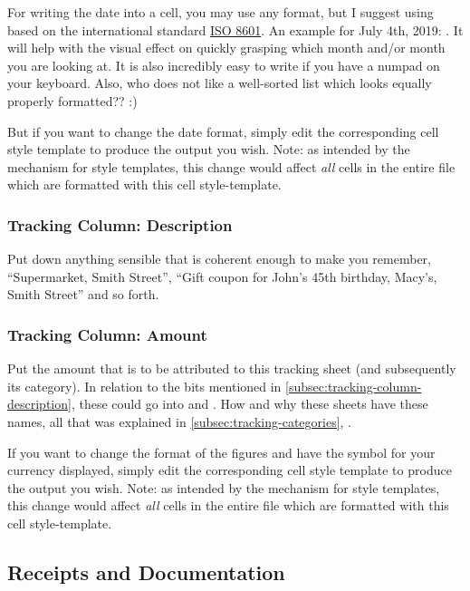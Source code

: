 For writing the date into a cell, you may use any format, but I suggest using  based on the international standard \href{https://en.wikipedia.org/wiki/ISO_8601}{ISO 8601}.
An example for July 4th, 2019: .
It will help with the visual effect on quickly grasping which month and/or month you are looking at.
It is also incredibly easy to write if you have a numpad on your keyboard.
Also, who does not like a well-sorted list which looks equally properly formatted?? :)

But if you want to change the date format, simply edit the corresponding cell style template to produce the output you wish.
Note: as intended by the mechanism for style templates, this change would affect \emph{all} cells in the entire file which are formatted with this cell style-template.

\subsubsection{Tracking Column: Description}
\label{subsec:tracking-column-description}

Put down anything sensible that is coherent enough to make you remember, \eg ``Supermarket, Smith Street'', ``Gift coupon for John's 45th birthday, Macy's, Smith Street'' and so forth.

\subsubsection{Tracking Column: Amount}
\label{subsec:tracking-column-amount}

Put the amount that is to be attributed to this tracking sheet (and subsequently its category).
In relation to the bits mentioned in \autoref{subsec:tracking-column-description}, these could go into  and .
How and why these sheets have these names, all that was explained in \autoref{subsec:tracking-categories}, .

If you want to change the format of the figures and have the symbol for your currency displayed, simply edit the corresponding cell style template to produce the output you wish.
Note: as intended by the mechanism for style templates, this change would affect \emph{all} cells in the entire file which are formatted with this cell style-template.

\subsection{Receipts and Documentation}
\label{subsec:tracking-receipts}

